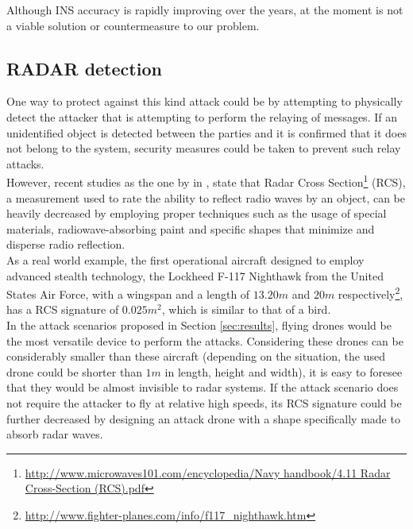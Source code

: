 \documentclass{article}
\begin{document}
Although INS accuracy is rapidly improving over the years, at the moment is not a viable solution or countermeasure to our problem.\\

\subsection{RADAR detection}

One way to protect against this kind attack could be by attempting to physically detect the attacker that is attempting to perform the relaying of messages. If an unidentified object is detected between the parties and it is confirmed that it does not belong to the system, security measures could be taken to prevent such relay attacks.\\

However, recent studies as the one by \citeauthor{cadirci2009rf} in \cite{cadirci2009rf}, state that Radar Cross Section\footnote{\url{http://www.microwaves101.com/encyclopedia/Navy handbook/4.11 Radar Cross-Section (RCS).pdf}} (RCS), a measurement used to rate the ability to reflect radio waves by an object, can be heavily decreased by employing proper techniques such as the usage of special materials, radiowave-absorbing paint and specific shapes that minimize and disperse radio reflection.\\

As a real world example, the first operational aircraft designed to employ advanced stealth technology, the Lockheed F-117 Nighthawk from the United States Air Force, with a wingspan and a length of $13.20m$ and $20m$ respectively\footnote{\url{http://www.fighter-planes.com/info/f117_nighthawk.htm}}, has a RCS signature of $0.025m^2$, which is similar to that of a bird\cite{cadirci2009rf}.\\

In the attack scenarios proposed in Section \ref{sec:results}, flying drones would be the most versatile device to perform the attacks. Considering these drones can be considerably smaller than these aircraft (depending on the situation, the used drone could be shorter than $1m$ in length, height and width), it is easy to foresee that they would be almost invisible to radar systems. If the attack scenario does not require the attacker to fly at relative high speeds, its RCS signature could be further decreased by designing an attack drone with a shape specifically made to absorb radar waves.\\
\end{document}
